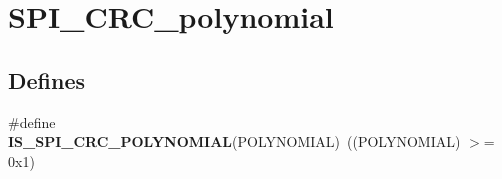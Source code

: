 \hypertarget{group__SPI__CRC__polynomial}{
\section{SPI\_\-CRC\_\-polynomial}
\label{group__SPI__CRC__polynomial}
}
\subsection*{Defines}
\begin{DoxyCompactItemize}
\item 
\hypertarget{group__SPI__CRC__polynomial_ga76eec5bbb44c873aa52966a9cb6c8f8c}{
\#define {\bfseries IS\_\-SPI\_\-CRC\_\-POLYNOMIAL}(POLYNOMIAL)~((POLYNOMIAL) $>$= 0x1)}
\label{group__SPI__CRC__polynomial_ga76eec5bbb44c873aa52966a9cb6c8f8c}

\end{DoxyCompactItemize}
